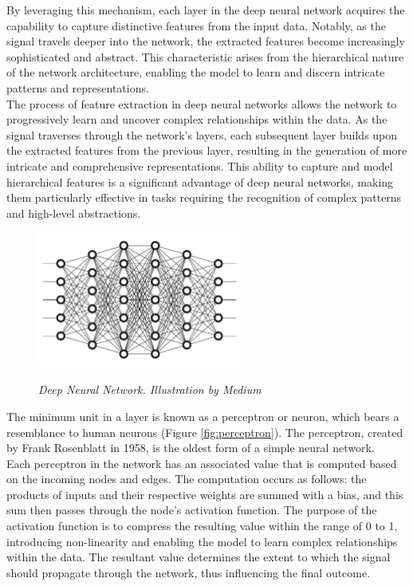 By leveraging this mechanism, each layer in the deep neural network acquires
the capability to capture distinctive features from the input data. Notably, as
the signal travels deeper into the network, the extracted features become
increasingly sophisticated and abstract. This characteristic arises from the
hierarchical nature of the network architecture, enabling the model to learn
and discern intricate patterns and representations. \\

The process of feature extraction in deep neural networks allows the network to
progressively learn and uncover complex relationships within the data. As the
signal traverses through the network's layers, each subsequent layer builds
upon the extracted features from the previous layer, resulting in the
generation of more intricate and comprehensive representations. This ability to
capture and model hierarchical features is a significant advantage of deep
neural networks, making them particularly effective in tasks requiring the
recognition of complex patterns and high-level abstractions.

\begin{figure}[H]
  \centering
  \includegraphics[width=0.6\textwidth]{imatges/preliminaries/deepnn.jpg}
  \caption[Deep Neural Network] {\textit{Deep Neural Network.
  Illustration by Medium}}
  {\label{fig:deep-nn}}
\end{figure}

The minimum unit in a layer is known as a perceptron or neuron, which bears a
resemblance to human neurons (Figure \ref{fig:perceptron}). The
perceptron, created by Frank Rosenblatt in 1958, is the oldest form of a simple
neural network. \\

Each perceptron in the network has an associated value that is computed based
on the incoming nodes and edges. The computation occurs as follows: the
products of inputs and their respective weights are summed with a bias, and
this sum then passes through the node's activation function. The purpose of the
activation function is to compress the resulting value within the range of 0 to
1, introducing non-linearity and enabling the model to learn complex
relationships within the data. The resultant value determines the extent to
which the signal should propagate through the network, thus influencing the
final outcome.


